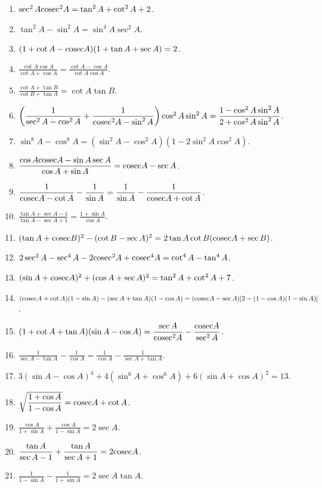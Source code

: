 \begin{enumerate}
\item $\sec^2A{\rm cosec}^2A = \tan^2A + \cot^2A + 2$.
\item $\tan^2A - \sin^2A = \sin^4A \sec^2A$.
\item $(1 + \cot A - {\rm cosec} A)(1 + \tan A + \sec A) = 2$.
\item $\frac{\cot A\cos A}{\cot A + \cos A} = \frac{\cot A - \cos A}{\cot A \cos A}$.
\item $\frac{\cot A + \tan B}{\cot B + \tan A} = \cot A \tan B$.
\item $\left(\frac{1}{\sec^2 A - \cos^2A} + \frac{1}{{\rm cosec}^2A - \sin^2A}\right)\cos^2A\sin^2A = \frac{1 - \cos^2A\sin^2A}{2 +
    \cos^2A\sin^2A}$.
\item $\sin^8A - \cos^8A = (\sin^2A - \cos^2A)(1 - 2\sin^2A\cos^2A)$.
\item $\frac{\cos A{\rm cosec} A - \sin A\sec A}{\cos A + \sin A} = {\rm cosec} A - \sec A$.
\item $\frac{1}{{\rm cosec} A - \cot A} - \frac{1}{\sin A} = \frac{1}{\sin A} - \frac{1}{{\rm cosec} A + \cot A}$.
\item $\frac{\tan A + \sec A - 1}{\tan A - \sec A + 1} = \frac{1 + \sin A}{\cos A}$.
\item $(\tan A + {\rm cosec} B)^2 - (\cot B - \sec A)^2 = 2\tan A\cot B({\rm cosec} A + \sec B)$.
\item $2\sec^2 A - \sec^4A - 2{\rm cosec}^2A + {\rm cosec}^4A = \cot^4A - \tan^4A$.
\item $(\sin A + {\rm cosec} A)^2 + (\cos A + \sec A)^2 = \tan^2A + \cot^2A + 7$.
\item $({\rm cosec} A + \cot A)(1 - \sin A) - (\sec A + \tan A)(1 - \cos A) = ({\rm cosec} A - \sec A)[2 - (1 - \cos A)(1 - \sin A)]$.
\item $(1 + \cot A + \tan A)(\sin A - \cos A) = \frac{\sec A}{{\rm cosec}^2A} - \frac{{\rm cosec} A}{\sec^2A}$.
\item $\frac{1}{\sec A - \tan A} - \frac{1}{\cos A} = \frac{1}{\cos A} - \frac{1}{\sec A + \tan A}$.
\item $3(\sin A - \cos A)^4 + 4(\sin^6 A + \cos^6 A) + 6(\sin A + \cos A)^2 = 13$.
\item $\sqrt{\frac{1 + \cos A}{1 - \cos A}} = {\rm cosec} A + \cot A$.
\item $\frac{\cos A}{1 + \sin A} + \frac{\cos A}{1 - \sin A} = 2\sec A$.
\item $\frac{\tan A}{\sec A - 1} + \frac{\tan A}{\sec A + 1} = 2{\rm cosec} A$.
\item $\frac{1}{1 - \sin A} - \frac{1}{1 + \sin A} = 2\sec A\tan A$.

\end{enumerate}
